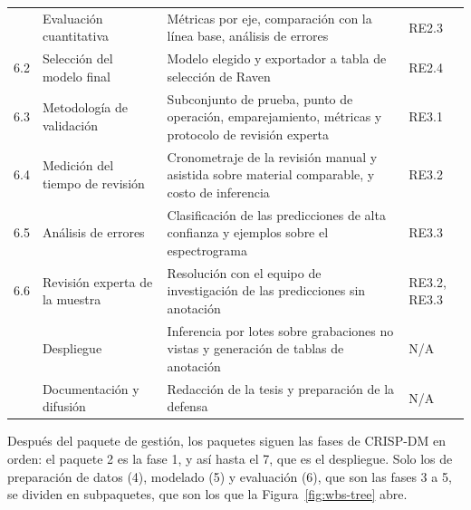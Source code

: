 \begin{table}[htbp]
\begin{tabular}{@{}L{0.8cm}L{4.4cm}L{6.6cm}L{2.2cm}@{}}
                 & Evaluación cuantitativa          & Métricas por eje, comparación con la línea base, análisis de errores                               & RE2.3               \\
        6.2         & Selección del modelo final       & Modelo elegido y exportador a tabla de selección de Raven                                          & RE2.4               \\
        6.3         & Metodología de validación        & Subconjunto de prueba, punto de operación, emparejamiento, métricas y protocolo de revisión experta & RE3.1               \\
        6.4         & Medición del tiempo de revisión  & Cronometraje de la revisión manual y asistida sobre material comparable, y costo de inferencia      & RE3.2               \\
        6.5         & Análisis de errores              & Clasificación de las predicciones de alta confianza y ejemplos sobre el espectrograma               & RE3.3               \\
        6.6         & Revisión experta de la muestra   & Resolución con el equipo de investigación de las predicciones sin anotación                         & RE3.2, RE3.3        \\
                   & Despliegue                       & Inferencia por lotes sobre grabaciones no vistas y generación de tablas de anotación               & N/A                 \\
                   & Documentación y difusión         & Redacción de la tesis y preparación de la defensa                                                  & N/A                 \\
        \bottomrule
    \end{tabular}
\end{table}

Después del paquete de gestión, los paquetes siguen las fases de CRISP-DM en orden:
el paquete 2 es la fase 1, y así hasta el 7, que es el despliegue. Solo los de
preparación de datos (4), modelado (5) y evaluación (6), que son las fases 3 a 5,
se dividen en subpaquetes, que son los que la Figura~\ref{fig:wbs-tree} abre.

